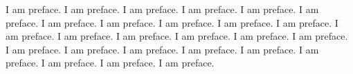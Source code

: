 \begin{preface}
\addchaptertocentry{\prefacename} %

I am preface. 
I am preface. I am preface. I am preface. I am preface. I am preface. I am preface. I am preface. I am preface. I am preface. I am preface. I am preface. I am preface. I am preface. I am preface. I am preface. I am preface. I am preface. I am preface. I am preface. I am preface. I am preface. I am preface. I am preface. I am preface. I am preface. 
\end{preface}